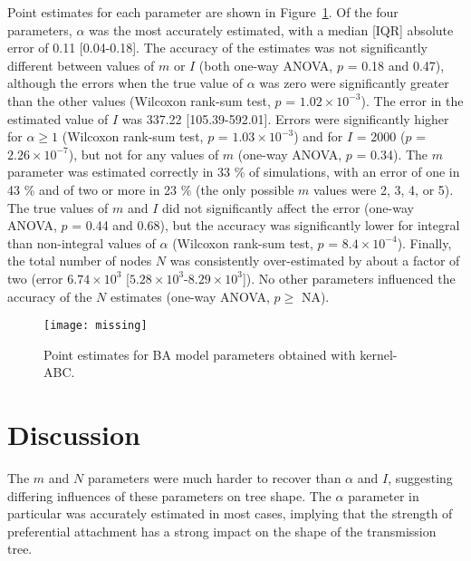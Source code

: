 \documentclass[12pt]{article}\usepackage[]{graphicx}\usepackage[]{color}
\begin{document}
Point estimates for each parameter are shown in Figure~\ref{fig:abcpt}. Of the
four parameters, $\alpha$ was the most accurately estimated, with a median
[IQR] absolute error of 
    0.11 
    [0.04-0.18].
The accuracy of the estimates was not significantly different between values of
$m$ or $I$ (both one-way ANOVA,
    $p$ = 0.18
and 
    0.47),
although the errors when the true value of $\alpha$ was zero were
significantly greater than the other values 
    (Wilcoxon rank-sum test, $p$ = \ensuremath{1.02\times 10^{-3}}).
The error in the estimated value of $I$ was
    337.22 
    [105.39-592.01].
Errors were significantly higher for $\alpha \geq 1$
    (Wilcoxon rank-sum test, $p$ = \ensuremath{1.03\times 10^{-3}})
and for $I$ = 2000
    ($p$ = \ensuremath{2.26\times 10^{-7}}),
but not for any values of $m$
    (one-way ANOVA, $p$ = 0.34).
The $m$ parameter was estimated correctly in
    33 \%
of simulations, with an error of one in
    43 \%
and of two or more in 
    23 \%
(the only possible $m$ values were 2, 3, 4, or 5). The true values of
$m$ and $I$ did not significantly affect the error
    (one-way ANOVA, $p$ = 0.44 and
                          0.68),
but the accuracy was significantly lower for integral than non-integral
values of $\alpha$
    (Wilcoxon rank-sum test, $p$ = \ensuremath{8.4\times 10^{-4}}).
Finally, the total number of nodes $N$ was consistently over-estimated by about a factor of two (error
    \ensuremath{6.74\times 10^{3}} 
    [\ensuremath{5.28\times 10^{3}}-\ensuremath{8.29\times 10^{3}}]).
No other parameters influenced the accuracy of the $N$ estimates 
    (one-way ANOVA, $p \geq$ NA).


\begin{figure}
    \texttt{[image: missing]}
    \caption{Point estimates for \gls{BA} model parameters obtained with
             kernel-ABC.}
    \label{fig:abcpt}
\end{figure}

\section*{Discussion}

The $m$ and $N$ parameters were much harder to recover than $\alpha$ and $I$,
suggesting differing influences of these parameters on tree shape. The $\alpha$
parameter in particular was accurately estimated in most cases, implying that
the strength of preferential attachment has a strong impact on the shape of the
transmission tree.
\end{document}
